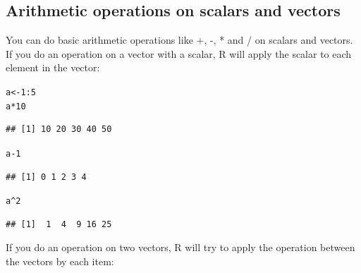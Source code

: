 \documentclass{tufte-book}\usepackage[]{graphicx}\usepackage[]{color}
\makeatletter
\newcommand{\hlnum}[1]{\textcolor[rgb]{0.686,0.059,0.569}{#1}}%
\newcommand{\hlopt}[1]{\textcolor[rgb]{0,0,0}{#1}}%
\newcommand{\hlstd}[1]{\textcolor[rgb]{0.345,0.345,0.345}{#1}}%
\newcommand{\hlkwb}[1]{\textcolor[rgb]{0.69,0.353,0.396}{#1}}%
\newenvironment{kframe}{%
 \def\at@end@of@kframe{}%
 \ifinner\ifhmode%
  \def\at@end@of@kframe{\end{minipage}}%
  \begin{minipage}{\columnwidth}%
 \fi\fi%
 \def\FrameCommand##1{\hskip\@totalleftmargin \hskip-\fboxsep
 \colorbox{shadecolor}{##1}\hskip-\fboxsep
     \hskip-\linewidth \hskip-\@totalleftmargin \hskip\columnwidth}%
 \MakeFramed {\advance\hsize-\width
   \@totalleftmargin\z@ \linewidth\hsize
   \@setminipage}}%
 {\par\unskip\endMakeFramed%
 \at@end@of@kframe}
\newenvironment{knitrout}{}{} %
\makeatother
\begin{document}
\subsection{Arithmetic operations on scalars and vectors}

You can do basic arithmetic operations like +, -, * and / on scalars and vectors. If you do an operation on a vector with a scalar, R will apply the scalar to each element in the vector:

\begin{footnotesize}
\begin{knitrout}
\color{fgcolor}\begin{kframe}
\begin{alltt}
\hlstd{a} \hlkwb{<-} \hlnum{1}\hlopt{:}\hlnum{5}
\hlstd{a} \hlopt{*} \hlnum{10}
\end{alltt}
\begin{verbatim}
## [1] 10 20 30 40 50
\end{verbatim}
\begin{alltt}
\hlstd{a} \hlopt{-} \hlnum{1}
\end{alltt}
\begin{verbatim}
## [1] 0 1 2 3 4
\end{verbatim}
\begin{alltt}
\hlstd{a} \hlopt{^} \hlnum{2}
\end{alltt}
\begin{verbatim}
## [1]  1  4  9 16 25
\end{verbatim}
\end{kframe}
\end{knitrout}
\end{footnotesize}

If you do an operation on two vectors, R will try to apply the operation between the vectors by each item:
\end{document}
